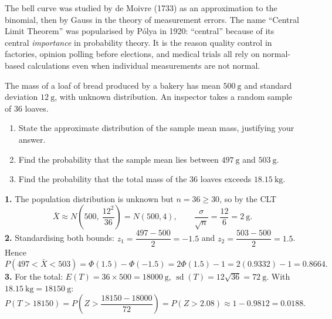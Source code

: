 \documentclass[11pt]{article}
\begin{document}
\begin{savaistu}
The bell curve was studied by de Moivre (1733) as an approximation to the binomial, then by Gauss in the theory of measurement errors. The name ``Central Limit Theorem'' was popularised by P\'olya in 1920: ``central'' because of its central \emph{importance} in probability theory. It is the reason quality control in factories, opinion polling before elections, and medical trials all rely on normal-based calculations even when individual measurements are not normal.
\end{savaistu}

\begin{exercice}
The mass of a loaf of bread produced by a bakery has mean $500\ \mathrm{g}$ and standard deviation $12\ \mathrm{g}$, with unknown distribution. An inspector takes a random sample of $36$ loaves.
\begin{enumerate}
\item State the approximate distribution of the sample mean mass, justifying your answer.
\item Find the probability that the sample mean lies between $497\ \mathrm{g}$ and $503\ \mathrm{g}$.
\item Find the probability that the total mass of the 36 loaves exceeds $18.15\ \mathrm{kg}$.
\end{enumerate}
\end{exercice}

\begin{corrige}
\textbf{1.} The population distribution is unknown but $n = 36 \geq 30$, so by the CLT
\[ \bar{X} \approx N\!\left(500,\ \frac{12^{2}}{36}\right) = N(500, 4), \qquad \frac{\sigma}{\sqrt{n}} = \frac{12}{6} = 2\ \mathrm{g}. \]
\textbf{2.} Standardising both bounds: $z_{1} = \dfrac{497-500}{2} = -1.5$ and $z_{2} = \dfrac{503-500}{2} = 1.5$. Hence
\[ P(497 < \bar{X} < 503) = \Phi(1.5) - \Phi(-1.5) = 2\Phi(1.5) - 1 = 2(0.9332) - 1 = 0.8664. \]
\textbf{3.} For the total: $E(T) = 36 \times 500 = 18000\ \mathrm{g}$, $\operatorname{sd}(T) = 12\sqrt{36} = 72\ \mathrm{g}$. With $18.15\ \mathrm{kg} = 18150\ \mathrm{g}$:
\[ P(T > 18150) = P\!\left(Z > \frac{18150 - 18000}{72}\right) = P(Z > 2.08) \approx 1 - 0.9812 = 0.0188. \]
\end{corrige}
\end{document}
